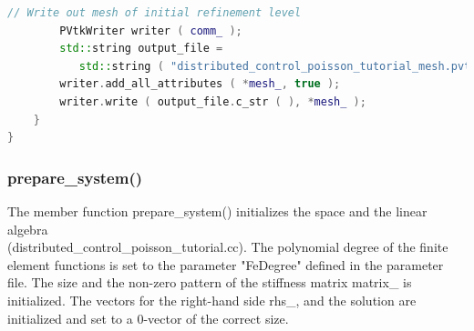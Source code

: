 \documentclass[a4paper, 11pt, twoside]{article}
\begin{document}
\begin{lstlisting}[language=C++, basicstyle={\footnotesize, \ttfamily}, keywordstyle=\color{blue}, numbers=none, tabsize=4]
        // Write out mesh of initial refinement level
        PVtkWriter writer ( comm_ );
        std::string output_file =
           std::string ( "distributed_control_poisson_tutorial_mesh.pvtu" );
        writer.add_all_attributes ( *mesh_, true );
        writer.write ( output_file.c_str ( ), *mesh_ );
    }
}
\end{lstlisting}

\subsubsection{prepare\_system()}
The member function prepare\_system() initializes the space and the linear algebra \\(distributed\_control\_poisson\_tutorial.cc). The polynomial degree of the finite element functions is set to the parameter "FeDegree" defined in the parameter file. The size and the non-zero pattern of the stiffness matrix matrix\_ is initialized. The vectors for the right-hand side rhs\_, and the solution are initialized and set to a 0-vector of the correct size.
\end{document}
